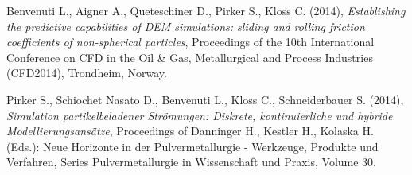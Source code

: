 \noindent
Benvenuti L., Aigner A., Queteschiner D., Pirker S., Kloss C. (2014),
\emph{Establishing the predictive capabilities of DEM simulations: sliding and
rolling friction coefficients of non-spherical particles}, Proceedings of the
10th International Conference on CFD in the Oil \& Gas, Metallurgical and
Process Industries (CFD2014), Trondheim, Norway.
\vspace{1ex}

\noindent
Pirker S., Schiochet Nasato D., Benvenuti L., Kloss C., Schneiderbauer S.
(2014), \emph{Simulation partikelbeladener Str\"{o}mungen: Diskrete,
kontinuierliche und hybride Modellierungsans\"{a}tze}, Proceedings of  Danninger
H., Kestler H., Kolaska H. (Eds.): Neue Horizonte in der Pulvermetallurgie -
Werkzeuge, Produkte und Verfahren, Series Pulvermetallurgie in Wissenschaft und Praxis, Volume 30.
\vspace{1ex}

% 
% 
